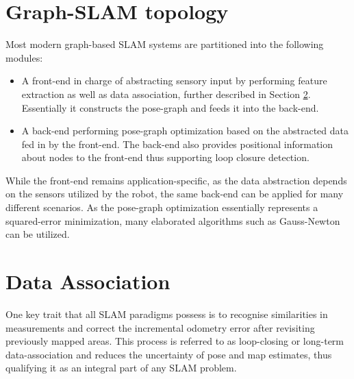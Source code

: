 \section{Graph-SLAM topology}
Most modern graph-based SLAM systems are partitioned into the following modules:
\begin{itemize}
	\item A front-end in charge of abstracting sensory input by performing feature extraction as well as data association, further described in Section \ref{dataAssociation}. Essentially it constructs the pose-graph and feeds it into the back-end.
	\item A back-end performing pose-graph optimization based on the abstracted data fed in by the front-end. The back-end also provides positional information about nodes to the front-end thus supporting loop closure detection. 
\end{itemize}

While the front-end remains application-specific, as the data abstraction depends on the sensors utilized by the robot, the same back-end can be applied for many different scenarios. As the pose-graph optimization essentially represents a squared-error minimization, many elaborated algorithms such as Gauss-Newton can be utilized.


\section{Data Association}\label{dataAssociation}
One key trait that all SLAM paradigms possess is to recognise similarities in measurements and correct the incremental odometry error after revisiting previously mapped areas. This process is referred to as loop-closing or long-term data-association and reduces the uncertainty of pose and map estimates, thus qualifying it as an integral part of any SLAM problem. 

